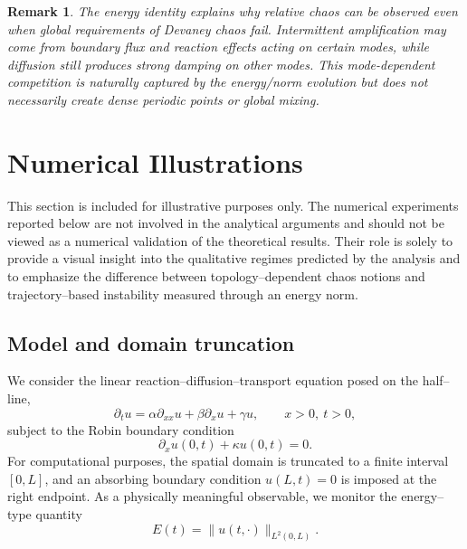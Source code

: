\documentclass[12pt]{article}
\newtheorem{remark}[theorem]{Remark}
\begin{document}
\begin{remark}
The energy identity explains why relative chaos can be observed even when global requirements of Devaney chaos fail. Intermittent amplification may come from boundary flux and reaction effects acting on certain modes, while diffusion still produces strong damping on other modes. This mode-dependent competition is
naturally captured by the energy/norm evolution but does not necessarily create dense periodic points or global mixing.
\end{remark}


\section{Numerical Illustrations}
\label{sec:numerics}

This section is included for illustrative purposes only. The numerical experiments reported below are not involved in the analytical arguments and should not be viewed as a numerical validation of the theoretical results. Their role is solely to provide a visual insight into the qualitative regimes predicted by the analysis and to emphasize the difference between topology--dependent chaos notions and trajectory--based instability measured
through an energy norm.

\subsection{Model and domain truncation}

We consider the linear reaction--diffusion--transport equation posed on the half--line,
\begin{equation}\label{eq:numerical_model}
\partial_t u
=
\alpha \partial_{xx} u
+
\beta \partial_x u
+
\gamma u,
\qquad x>0,\ t>0,
\end{equation}
subject to the Robin boundary condition
\begin{equation}\label{eq:numerical_robin}
\partial_x u(0,t)+\kappa u(0,t)=0.
\end{equation}
For computational purposes, the spatial domain is truncated to a finite interval $[0,L]$, and an absorbing boundary condition $u(L,t)=0$ is imposed at the right endpoint. As a physically meaningful observable, we monitor the energy--type quantity
\begin{equation}\label{eq:energy_def}
E(t)=\|u(t,\cdot)\|_{L^2(0,L)}.
\end{equation}
\end{document}

